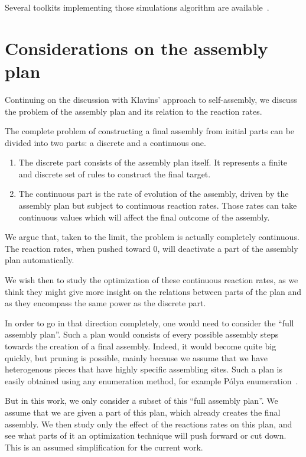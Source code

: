 		Several toolkits implementing those simulations algorithm are available~\cite{Zhang:2005p4134, Li:2008p11431, Alur:2001p9648}. 


\section{Considerations on the assembly plan} %
\label{sec:considerations_on_the_assembly_plan}
	Continuing on the discussion with Klavins' approach to self-assembly, we discuss the problem of the assembly plan and its relation to the reaction rates.
	
	The complete problem of constructing a final assembly from initial parts can be divided into two parts: a discrete and a continuous one.
	\begin{enumerate}
		\item The discrete part consists of the assembly plan itself. It represents a finite and discrete set of rules to construct the final target.
		\item The continuous part is the rate of evolution of the assembly, driven by the assembly plan but subject to continuous reaction rates. Those rates can take continuous values which will affect the final outcome of the assembly.
	\end{enumerate}
	
	We argue that, taken to the limit, the problem is actually completely continuous. The reaction rates, when pushed toward $0$, will deactivate a part of the assembly plan automatically.
	
	We wish then to study the optimization of these continuous reaction rates, as we think they might give more insight on the relations between parts of the plan and as they encompass the same power as the discrete part.
	
	In order to go in that direction completely, one would need to consider the ``full assembly plan''. Such a plan would consists of every possible assembly steps towards the creation of a final assembly. Indeed, it would become quite big quickly, but pruning is possible, mainly because we assume that we have heterogenous pieces that have highly specific assembling sites. Such a plan is easily obtained using any enumeration method, for example Pólya enumeration~\cite{Polya:1937p11740}.
	
	But in this work, we only consider a subset of this ``full assembly plan''. We assume that we are given a part of this plan, which already creates the final assembly. We then study only the effect of the reactions rates on this plan, and see what parts of it an optimization technique will push forward or cut down. This is an assumed simplification for the current work.
	
